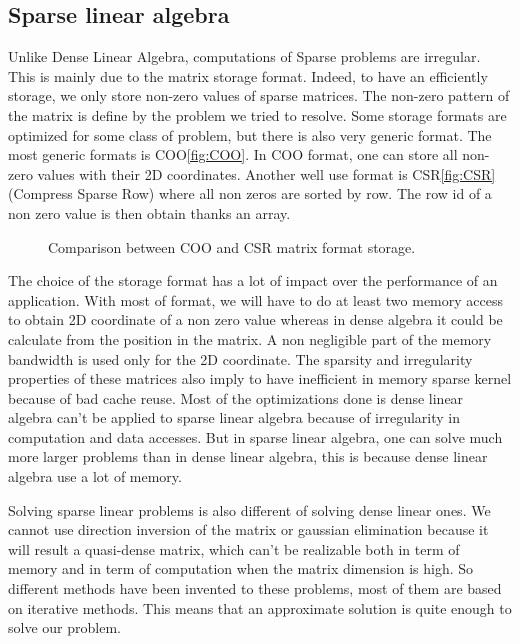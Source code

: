 \subsection{Sparse linear algebra}
Unlike Dense Linear Algebra, computations of Sparse problems are irregular.
%
This is mainly due to the matrix storage format.
%
Indeed, to have an efficiently storage, we only store non-zero values of sparse matrices.
%
The non-zero pattern of the matrix is define by the problem we tried to resolve.
%
Some storage formats are optimized for some class of problem, but there is also very generic format.
%
The most generic formats is COO\ref{fig:COO}.
%
In COO format, one can store all non-zero values with their 2D coordinates.
%
Another well use format is CSR\ref{fig:CSR} (Compress Sparse Row) where all non zeros are sorted by row.
%
The row id of a non zero value is then obtain thanks an array.

\begin{figure}[!ht]
     \begin{center}
    \end{center}
    \caption{Comparison between COO and CSR matrix format storage.}
    \label{fig:matrix_storage}
\end{figure}

The choice of the storage format has a lot of impact over the performance of an application.
%
With most of format, we will have to do at least two memory access to obtain 2D coordinate of a non zero value whereas in dense algebra it could be calculate from the position in the matrix.
%
A non negligible part of the memory bandwidth is used only for the 2D coordinate.
%
The sparsity and irregularity properties of these matrices also imply to have inefficient in memory sparse kernel because of bad cache reuse.
%
Most of the optimizations done is dense linear algebra can't be applied to sparse linear algebra because of irregularity in computation and data accesses.
%
But in sparse linear algebra, one can solve much more larger problems than in dense linear algebra, this is because dense linear algebra use a lot of memory.


Solving sparse linear problems is also different of solving dense linear ones.
%
We cannot use direction inversion of the matrix or gaussian elimination because it will result a quasi-dense matrix, which can't be realizable both in term of memory and in term of computation when the matrix dimension is high.
%
So different methods have been invented to these problems, most of them are based on iterative methods.
%
This means that an approximate solution is quite enough to solve our problem.
